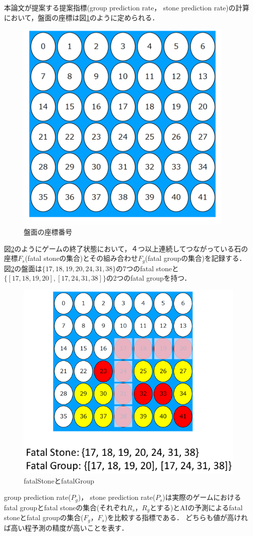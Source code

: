 本論文が提案する提案指標(group prediction rate， stone prediction rate)の計算において，盤面の座標は図\ref{fig:index}のように定められる．
\begin{figure}[htbp]
	\centering
	\includegraphics[width=300pt]{./figure/index.png}
	\caption{盤面の座標番号}
	\label{fig:index}
\end{figure}
図\ref{fig:fatalGroup}のようにゲームの終了状態において，４つ以上連続してつながっている石の座標$F_s$(fatal stoneの集合)とその組み合わせ$F_g$(fatal groupの集合)を記録する．
図\ref{fig:fatalGroup}の盤面は$\{17, 18, 19, 20, 24, 31, 38\}$の7つのfatal stoneと$\{[17, 18, 19, 20], [17, 24, 31, 38]\}$の2つのfatal groupを持つ．
\begin{figure}[htbp]
	\centering
	\includegraphics[width=\linewidth]{./figure/fatalGroup.png}
	\caption{fatalStoneとfatalGroup}
	\label{fig:fatalGroup}
\end{figure}
group prediction rate($P_g$)， stone prediction rate($P_s$)は実際のゲームにおけるfatal groupとfatal stoneの集合(それぞれ$R_s， R_g$とする)とAIの予測によるfatal stoneとfatal groupの集合($F_g， F_s$)を比較する指標である．
どちらも値が高ければ高い程予測の精度が高いことを表す．


